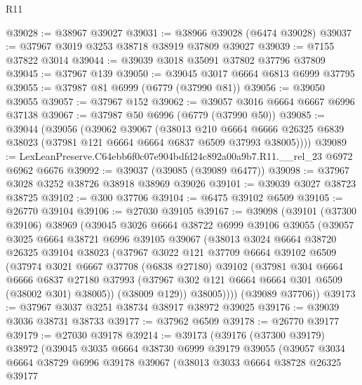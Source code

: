 \begin{lexlean}{R11}
\begin{coremodule}
@39028 := @38967 @39027
@39031 := @38966 @39028 (@6474 @39028)
@39037 := @37967 @3019 @3253 @38718 @38919 @37809 @39027
@39039 := @7155 @37822 @3014
@39044 := @39039 @3018 @35091 @37802 @37796 @37809
@39045 := @37967 @139
@39050 := @39045 @3017 @6664 @6813 @6999 @37795
@39055 := @37987 @81 @6999 (@6779 (@37990 @81))
@39056 := @39050 @39055
@39057 := @37967 @152
@39062 := @39057 @3016 @6664 @6667 @6996 @37138
@39067 := @37987 @50 @6996 (@6779 (@37990 @50))
@39085 := @39044
    (@39056
      (@39062
        @39067
        (@38013
          @210
          @6664
          @6666
          @26325
          @6839
          @38023
          (@37981 @121 @6664 @6664 @6837 @6509 @37993 @38005))))
@39089 := LexLeanPreserve.C64ebb6f0c07e904bdfd24c892a00a9b7.R11.__rel_23 @6972 @6962 @6676
@39092 := @39037 (@39085 (@39089 @6477))
@39098 := @37967 @3028 @3252 @38726 @38918 @38969 @39026
@39101 := @39039 @3027 @38723 @38725
@39102 := @300 @37706
@39104 := @6475 @39102 @6509
@39105 := @26770 @39104
@39106 := @27030 @39105
@39167 := @39098
    (@39101
      (@37300 @39106)
      @38969
      (@39045
        @3026
        @6664
        @38722
        @6999
        @39106
        @39055
        (@39057
          @3025
          @6664
          @38721
          @6996
          @39105
          @39067
          (@38013
            @3024
            @6664
            @38720
            @26325
            @39104
            @38023
            (@37967
              @3022
              @121
              @37709
              @6664
              @39102
              @6509
              (@37974
                @3021
                @6667
                @37708
                (@6838 @27180)
                @39102
                (@37981
                  @304
                  @6664
                  @6666
                  @6837
                  @27180
                  @37993
                  (@37967 @302 @121 @6664 @6664 @301 @6509 (@38002 @301) @38005))
                (@38009 @129))
              @38005))))
      (@39089 @37706))
@39173 := @37967 @3037 @3251 @38734 @38917 @38972 @39025
@39176 := @39039 @3036 @38731 @38733
@39177 := @37962 @6509
@39178 := @26770 @39177
@39179 := @27030 @39178
@39214 := @39173
    (@39176
      (@37300 @39179)
      @38972
      (@39045
        @3035
        @6664
        @38730
        @6999
        @39179
        @39055
        (@39057
          @3034
          @6664
          @38729
          @6996
          @39178
          @39067
          (@38013
            @3033
            @6664
            @38728
            @26325
            @39177

\end{coremodule}
\end{lexlean}
